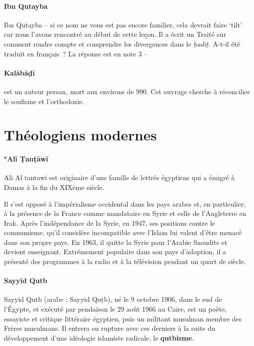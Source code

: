 \paragraph{Ibn Qutayba}
Ibn Qutayba -- si ce nom ne vous est pas encore familier, cela devrait
faire `tilt' car nous l'avons rencontré au début de cette leçon. Il a
écrit un Traité sur comment rendre compte et comprendre les divergences
dans le \emph{ḥadīṯ.} A-t-il été traduit en français~? La réponse est en
note 3 --
\pageref{Theol:IbnQutayba1}
\paragraph{Kalābāḏī}
  est un auteur persan, mort aux environs de 990. Cet ouvrage
cherche à réconcilier le soufisme et l'orthodoxie. 
\pageref{theol:Kalabadi}







\section{Théologiens modernes}

\paragraph{ʿAlī Ṭanṭāwī} \label{theo:AliAlTawani}
{Ali Al tantawi est originaire d'une
famille de lettrés égyptiens qui a émigré à Damas à la fin du XIXème
siècle.


Il s'est opposé à l'impérialisme occidental dans les pays
arabes et, en particulier, à la présence de la France comme mandataire
en Syrie et celle de l'Angleterre en Irak. Après l'indépendance de la
Syrie, en 1947, ses positions contre le communisme, qu'il considère
incompatible avec l'Islam lui valent d'être menacé dans son propre pays.
En 1963, il quitte la Syrie pour l'Arabie Saoudite et devient
enseignant.
Extrêmement populaire dans son pays d'adoption, il a
présenté des programmes à la radio et à la télévision pendant un quart
de
siècle.}

\label{theol:SayyidQutb}
\paragraph{Sayyid Qutb}
Sayyid Qutb (arabe : Sayyid Quṭb), né le 9 octobre 1906, dans le sud de l'Égypte, et exécuté par pendaison le 29 août 1966 au Caire, est un poète, essayiste et critique littéraire égyptien, puis un militant musulman membre des Frères musulmans. Il entrera en rupture avec ces derniers à la suite du développement d'une idéologie islamiste radicale, le \textbf{qutbisme}.


